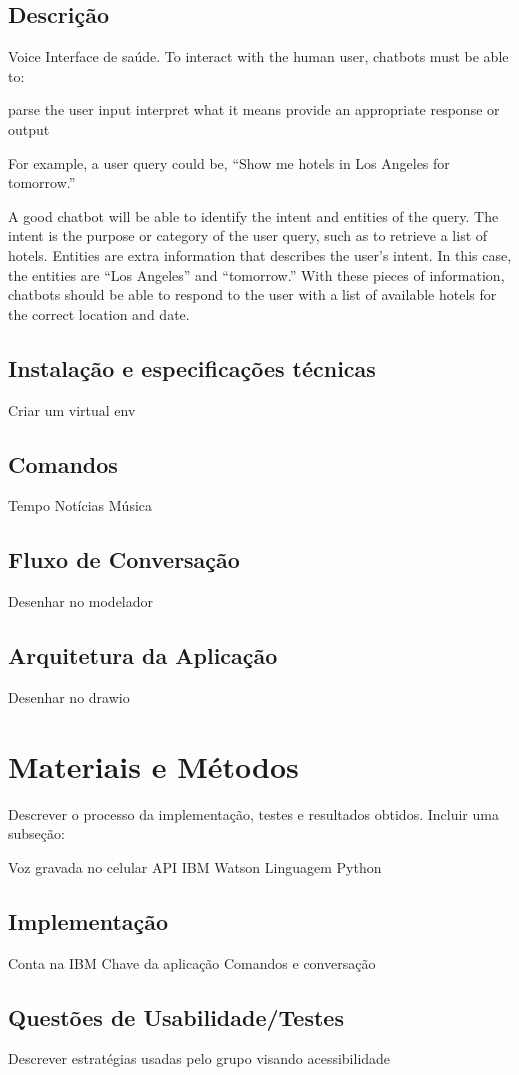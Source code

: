 \documentclass[
	12pt,				%
	oneside,   	        %
	a4paper,			%
	english,			%
	french,				%
	spanish,			%
	brazil,				%
	]{pacotes/abntex2}
\begin{document}
\subsection{Descrição}
Voice Interface de saúde.
To interact with the human user, chatbots must be able to:

    parse the user input
    interpret what it means
    provide an appropriate response or output

For example, a user query could be, “Show me hotels in Los Angeles for tomorrow.”

A good chatbot will be able to identify the intent and entities of the query. The intent is the purpose or category of the user query, such as to retrieve a list of hotels. Entities are extra information that describes the user’s intent. In this case, the entities are “Los Angeles” and “tomorrow.” With these pieces of information, chatbots should be able to respond to the user with a list of available hotels for the correct location and date. 
\subsection{Instalação e especificações técnicas}
Criar um virtual env
\subsection{Comandos}
Tempo
Notícias
Música
\subsection{Fluxo de Conversação}
Desenhar no modelador
\subsection{Arquitetura da Aplicação}
Desenhar no drawio

\section{Materiais e Métodos}
Descrever o processo da implementação, testes e resultados obtidos. Incluir uma
subseção:

Voz gravada no celular
API IBM Watson
Linguagem Python
\subsection{Implementação}
Conta na IBM
Chave da aplicação
Comandos e conversação
\subsection{Questões de Usabilidade/Testes}
Descrever estratégias usadas pelo grupo visando acessibilidade
\end{document}

